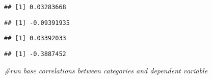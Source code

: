 \documentclass[
]{article}
\newenvironment{Shaded}{\begin{snugshade}}{\end{snugshade}}
\newcommand{\CommentTok}[1]{\textcolor[rgb]{0.56,0.35,0.01}{\textit{#1}}}
\newcommand{\KeywordTok}[1]{\textcolor[rgb]{0.13,0.29,0.53}{\textbf{#1}}}
\newcommand{\NormalTok}[1]{#1}
\newcommand{\OperatorTok}[1]{\textcolor[rgb]{0.81,0.36,0.00}{\textbf{#1}}}
\begin{document}
\begin{Shaded}
\end{Shaded}

\begin{verbatim}
## [1] 0.03283668
\end{verbatim}

\begin{Shaded}
\end{Shaded}

\begin{verbatim}
## [1] -0.09391935
\end{verbatim}

\begin{Shaded}
\end{Shaded}

\begin{verbatim}
## [1] 0.03392033
\end{verbatim}

\begin{Shaded}
\end{Shaded}

\begin{verbatim}
## [1] -0.3887452
\end{verbatim}

\begin{Shaded}
\begin{Highlighting}[]
\CommentTok{#run base correlations between categories and dependent variable}
\end{Highlighting}
\end{Shaded}
\end{document}
